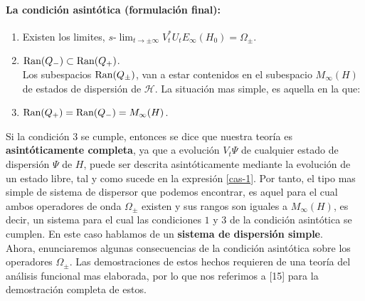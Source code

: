 \documentclass[12pt]{book}
\numberwithin{equation}{chapter}
\def\rar{\rightarrow}
\def\H{\mathcal{H}}
\def\O{\Omega}
\def\slim{s\mbox{-}\lim}
\begin{document}
\paragraph{La condici\'on asint\'otica (formulaci\'on final):}
\begin{enumerate}
\item Existen los limites, $ \slim_{ t \rar \pm \infty } V_{t}^{*}U_{t} E_{\infty}(H_{0})= \O_{\pm} $. 

\item $ \hbox{Ran}(Q_{-}) \subset \hbox{Ran} (Q_{+}) $.\\
Los subespacios $\hbox{Ran}(Q_{\pm})$, van a estar contenidos en el subespacio $M_{\infty}(H)$ de estados de dispersi\'on de $\H$. La situaci\'on mas simple, es aquella en la que:

\item $ \hbox{Ran}(Q_{+})= \hbox{Ran}(Q_{-}) =M_{\infty}(H) $.
\end{enumerate}

\rightline{$\dag$}
\vspace{5 mm}

Si la condici\'on $3$ se cumple, entonces se dice que nuestra teor\'ia es {\bf asint\'oticamente completa}, ya que a evoluci\'on $V_{t} \Psi $ de cualquier estado de dispersi\'on $ \Psi$ de $H$, puede ser descrita asint\'oticamente mediante la evoluci\'on de un estado libre, tal y como sucede en la expresi\'on \eqref{cas-1}. Por tanto, el tipo mas simple de sistema de dispersor que podemos encontrar, es aquel para el cual ambos operadores de onda $\O_{\pm}$ existen y sus rangos son iguales a $M_{\infty}(H)$, es decir, un sistema para el cual las condiciones $1$ y $3$ de la condici\'on asint\'otica se cumplen. En este caso hablamos de un {\bf sistema de dispersi\'on simple}.\\
Ahora, enunciaremos algunas consecuencias de la condici\'on asint\'otica sobre los operadores $\O_{\pm}$. Las demostraciones de estos hechos requieren de una teor\'ia del an\'alisis funcional mas elaborada, por lo que nos referimos a [15] para la demostraci\'on completa de estos.
\end{document}
